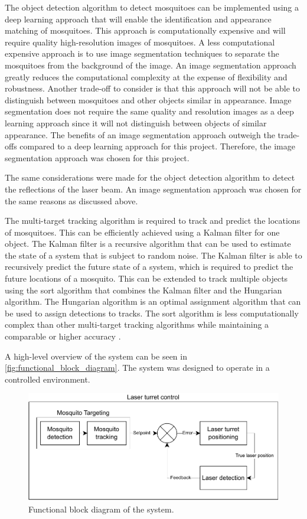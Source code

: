 The object detection algorithm to detect mosquitoes can be implemented using a deep learning approach that will enable the identification and appearance matching of mosquitoes. This approach is computationally expensive and will require quality high-resolution images of mosquitoes. A less computational expensive approach is to use image segmentation techniques to separate the mosquitoes from the background of the image. An image segmentation approach greatly reduces the computational complexity at the expense of flexibility and robustness. Another trade-off to consider is that this approach will not be able to distinguish between mosquitoes and other objects similar in appearance. Image segmentation does not require the same quality and resolution images as a deep learning approach since it will not distinguish between objects of similar appearance. The benefits of an image segmentation approach outweigh the trade-offs compared to a deep learning approach for this project. Therefore, the image segmentation approach was chosen for this project.

The same considerations were made for the object detection algorithm to detect the reflections of the laser beam. An image segmentation approach was chosen for the same reasons as discussed above.

The multi-target tracking algorithm is required to track and predict the locations of mosquitoes. This can be efficiently achieved using a Kalman filter for one object. The Kalman filter is a recursive algorithm that can be used to estimate the state of a system that is subject to random noise. The Kalman filter is able to recursively predict the future state of a system, which is required to predict the future locations of a mosquito. This can be extended to track multiple objects using the \gls{sort} algorithm that combines the Kalman filter and the Hungarian algorithm. The Hungarian algorithm is an optimal assignment algorithm that can be used to assign detections to tracks. The \gls{sort} algorithm is less computationally complex than other multi-target tracking algorithms while maintaining a comparable or higher accuracy \cite{SORT-Bewley2017}.

A high-level overview of the system can be seen in \autoref{fig:functional_block_diagram}. The system was designed to operate in a controlled environment.
\begin{figure}[h]
      \centering
      \includegraphics[width=1\textwidth]{figures/function_block_diagram.drawio.pdf}
      \caption{Functional block diagram of the system.}
      \label{fig:functional_block_diagram}
\end{figure}

\newpage


